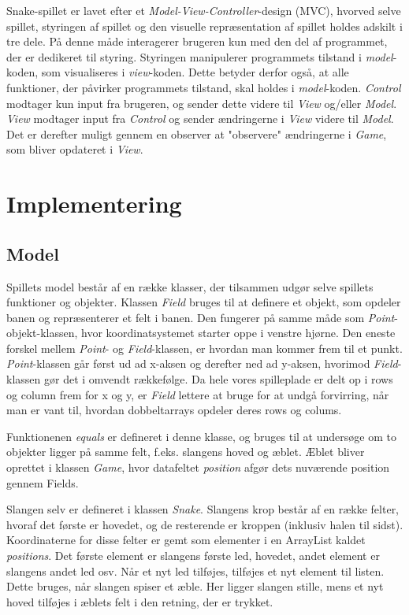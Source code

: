\documentclass{report}
\begin{document}
Snake-spillet er lavet efter et \textit{Model-View-Controller}-design (MVC), hvorved selve spillet, styringen af spillet og den visuelle repræsentation af spillet holdes adskilt i tre dele. På denne måde interagerer brugeren kun med den del af programmet, der er dedikeret til styring. Styringen manipulerer programmets tilstand i \textit{model}-koden, som visualiseres i \textit{view}-koden. Dette betyder derfor også, at alle funktioner, der påvirker programmets tilstand, skal holdes i \textit{model}-koden. \textit{Control} modtager kun input fra brugeren, og sender dette videre til \textit{View} og/eller \textit{Model}. \textit{View} modtager input fra \textit{Control} og sender ændringerne i \textit{View} videre til \textit{Model}. Det er derefter muligt gennem en observer at "observere" ændringerne i \textit{Game}, som bliver opdateret i \textit{View}.

\section{Implementering}

\subsection{Model}
Spillets model består af en række klasser, der tilsammen udgør selve spillets funktioner og objekter.
Klassen \textit{Field} bruges til at definere et objekt, som opdeler banen og repræsenterer et felt i banen. Den fungerer på samme måde som \textit{Point}-objekt-klassen, hvor koordinatsystemet starter oppe i venstre hjørne. Den eneste forskel mellem \textit{Point}- og \textit{Field}-klassen, er hvordan man kommer frem til et punkt. \textit{Point}-klassen går først ud ad x-aksen og derefter ned ad y-aksen, hvorimod \textit{Field}-klassen gør det i omvendt rækkefølge. Da hele vores spilleplade er delt op i rows og column frem for x og y, er \textit{Field} lettere at bruge for at undgå forvirring, når man er vant til, hvordan dobbeltarrays opdeler deres rows og colums.

Funktionenen \textit{equals} er defineret i denne klasse, og bruges til at undersøge om to objekter ligger på samme felt, f.eks. slangens hoved og æblet. Æblet bliver oprettet i klassen \textit{Game}, hvor datafeltet \textit{position} afgør dets nuværende position gennem Fields. 
\linebreak

Slangen selv er defineret i klassen \textit{Snake}. Slangens krop består af en række felter, hvoraf det første er hovedet, og de resterende er kroppen (inklusiv halen til sidst). Koordinaterne for disse felter er gemt som elementer i en ArrayList kaldet \textit{positions}. Det første element er slangens første led, hovedet, andet element er slangens andet led osv. Når et nyt led tilføjes, tilføjes et nyt element til listen. Dette bruges, når slangen spiser et æble. Her ligger slangen stille, mens et nyt hoved tilføjes i æblets felt i den retning, der er trykket. 
\end{document}
